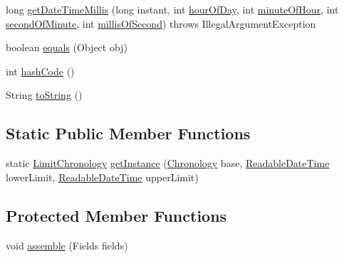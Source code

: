 \begin{DoxyCompactItemize}
\item 
long \hyperlink{classorg_1_1joda_1_1time_1_1chrono_1_1_limit_chronology_a5ba371094fbdcb6dce1b1ac192fc59e8}{get\-Date\-Time\-Millis} (long instant, int \hyperlink{classorg_1_1joda_1_1time_1_1chrono_1_1_assembled_chronology_a7bb60a080dea96b8103a530f88a4fb54}{hour\-Of\-Day}, int \hyperlink{classorg_1_1joda_1_1time_1_1chrono_1_1_assembled_chronology_afae2a5fd2073af85a1d2008d98313da7}{minute\-Of\-Hour}, int \hyperlink{classorg_1_1joda_1_1time_1_1chrono_1_1_assembled_chronology_adc867c7197cd2ae0d480003d22d9fdb7}{second\-Of\-Minute}, int \hyperlink{classorg_1_1joda_1_1time_1_1chrono_1_1_assembled_chronology_a16f1e731a421127a787ac71ffded4387}{millis\-Of\-Second})  throws Illegal\-Argument\-Exception     
\item 
boolean \hyperlink{classorg_1_1joda_1_1time_1_1chrono_1_1_limit_chronology_a391ea53354eb95608d409ca17dd8f085}{equals} (Object obj)
\item 
int \hyperlink{classorg_1_1joda_1_1time_1_1chrono_1_1_limit_chronology_af9e54f8688a8023678f9c23dc59b3fe5}{hash\-Code} ()
\item 
String \hyperlink{classorg_1_1joda_1_1time_1_1chrono_1_1_limit_chronology_a0b047f2950f2067aeb539243c025cbde}{to\-String} ()
\end{DoxyCompactItemize}
\subsection*{Static Public Member Functions}
\begin{DoxyCompactItemize}
\item 
static \hyperlink{classorg_1_1joda_1_1time_1_1chrono_1_1_limit_chronology}{Limit\-Chronology} \hyperlink{classorg_1_1joda_1_1time_1_1chrono_1_1_limit_chronology_ac810924559b874a35ee89123257e10d2}{get\-Instance} (\hyperlink{classorg_1_1joda_1_1time_1_1_chronology}{Chronology} base, \hyperlink{interfaceorg_1_1joda_1_1time_1_1_readable_date_time}{Readable\-Date\-Time} lower\-Limit, \hyperlink{interfaceorg_1_1joda_1_1time_1_1_readable_date_time}{Readable\-Date\-Time} upper\-Limit)
\end{DoxyCompactItemize}
\subsection*{Protected Member Functions}
\begin{DoxyCompactItemize}
\item 
void \hyperlink{classorg_1_1joda_1_1time_1_1chrono_1_1_limit_chronology_a63a3a07e19a6b13d57cc713cdf1bb6e2}{assemble} (Fields fields)
\end{DoxyCompactItemize}



